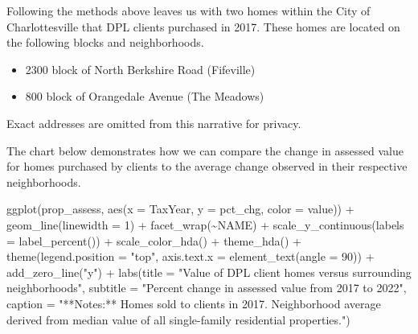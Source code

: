 \documentclass[
  letterpaper,
  DIV=11,
  numbers=noendperiod]{scrartcl}
\newenvironment{Shaded}{\begin{snugshade}}{\end{snugshade}}
\newcommand{\AttributeTok}[1]{\textcolor[rgb]{0.40,0.45,0.13}{#1}}
\newcommand{\DecValTok}[1]{\textcolor[rgb]{0.68,0.00,0.00}{#1}}
\newcommand{\FunctionTok}[1]{\textcolor[rgb]{0.28,0.35,0.67}{#1}}
\newcommand{\NormalTok}[1]{\textcolor[rgb]{0.00,0.23,0.31}{#1}}
\newcommand{\SpecialCharTok}[1]{\textcolor[rgb]{0.37,0.37,0.37}{#1}}
\newcommand{\StringTok}[1]{\textcolor[rgb]{0.13,0.47,0.30}{#1}}
\providecommand{\tightlist}{%
  \setlength{\itemsep}{0pt}\setlength{\parskip}{0pt}}\usepackage{longtable,booktabs,array}
\begin{document}
Following the methods above leaves us with two homes within the City of
Charlottesville that DPL clients purchased in 2017. These homes are
located on the following blocks and neighborhoods.

\begin{itemize}
\tightlist
\item
  2300 block of North Berkshire Road (Fifeville)
\item
  800 block of Orangedale Avenue (The Meadows)
\end{itemize}

Exact addresses are omitted from this narrative for privacy.

The chart below demonstrates how we can compare the change in assessed
value for homes purchased by clients to the average change observed in
their respective neighborhoods.

\begin{Shaded}
\begin{Highlighting}[]
\FunctionTok{ggplot}\NormalTok{(prop\_assess, }\FunctionTok{aes}\NormalTok{(}\AttributeTok{x =}\NormalTok{ TaxYear, }\AttributeTok{y =}\NormalTok{ pct\_chg, }\AttributeTok{color =}\NormalTok{ value)) }\SpecialCharTok{+}
  \FunctionTok{geom\_line}\NormalTok{(}\AttributeTok{linewidth =} \DecValTok{1}\NormalTok{) }\SpecialCharTok{+}
  \FunctionTok{facet\_wrap}\NormalTok{(}\SpecialCharTok{\textasciitilde{}}\NormalTok{NAME) }\SpecialCharTok{+}
  \FunctionTok{scale\_y\_continuous}\NormalTok{(}\AttributeTok{labels =} \FunctionTok{label\_percent}\NormalTok{()) }\SpecialCharTok{+}
  \FunctionTok{scale\_color\_hda}\NormalTok{() }\SpecialCharTok{+}
  \FunctionTok{theme\_hda}\NormalTok{() }\SpecialCharTok{+}
  \FunctionTok{theme}\NormalTok{(}\AttributeTok{legend.position =} \StringTok{"top"}\NormalTok{,}
        \AttributeTok{axis.text.x =} \FunctionTok{element\_text}\NormalTok{(}\AttributeTok{angle =} \DecValTok{90}\NormalTok{)) }\SpecialCharTok{+}
  \FunctionTok{add\_zero\_line}\NormalTok{(}\StringTok{"y"}\NormalTok{) }\SpecialCharTok{+}
  \FunctionTok{labs}\NormalTok{(}\AttributeTok{title =} \StringTok{"Value of DPL client homes versus surrounding neighborhoods"}\NormalTok{,}
       \AttributeTok{subtitle =} \StringTok{"Percent change in assessed value from 2017 to 2022"}\NormalTok{,}
       \AttributeTok{caption =} \StringTok{"**Notes:** Homes sold to clients in 2017. Neighborhood average derived from median value of all single{-}family residential properties."}\NormalTok{)}
\end{Highlighting}
\end{Shaded}
\end{document}
